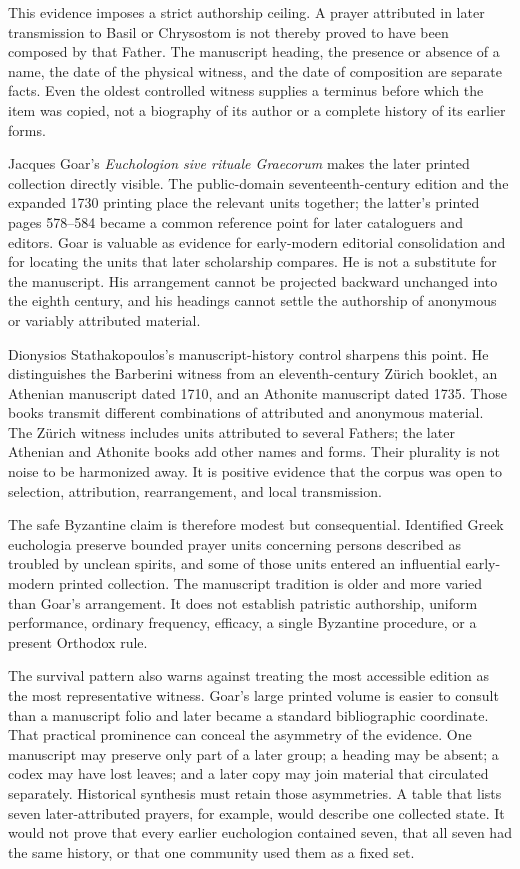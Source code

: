 This evidence imposes a strict authorship ceiling. A prayer attributed in later
transmission to Basil or Chrysostom is not thereby proved to have been composed
by that Father. The manuscript heading, the presence or absence of a name, the
date of the physical witness, and the date of composition are separate facts.
Even the oldest controlled witness supplies a terminus before which the item
was copied, not a biography of its author or a complete history of its earlier
forms.

Jacques Goar's \emph{Euchologion sive rituale Graecorum} makes the later printed
collection directly visible. The public-domain seventeenth-century edition and
the expanded 1730 printing place the relevant units together; the latter's
printed pages 578--584 became a common reference point for later cataloguers
and editors. Goar is valuable as evidence for early-modern editorial
consolidation and for locating the units that later scholarship compares. He
is not a substitute for the manuscript. His arrangement cannot be projected
backward unchanged into the eighth century, and his headings cannot settle the
authorship of anonymous or variably attributed material.

Dionysios Stathakopoulos's manuscript-history control sharpens this point. He
distinguishes the Barberini witness from an eleventh-century Zürich booklet,
an Athenian manuscript dated 1710, and an Athonite manuscript dated 1735.
Those books transmit different combinations of attributed and anonymous
material. The Zürich witness includes units attributed to several Fathers; the
later Athenian and Athonite books add other names and forms. Their plurality is
not noise to be harmonized away. It is positive evidence that the corpus was
open to selection, attribution, rearrangement, and local transmission.

The safe Byzantine claim is therefore modest but consequential. Identified
Greek euchologia preserve bounded prayer units concerning persons described
as troubled by unclean spirits, and some of those units entered an influential
early-modern printed collection. The manuscript tradition is older and more
varied than Goar's arrangement. It does not establish patristic authorship,
uniform performance, ordinary frequency, efficacy, a single Byzantine
procedure, or a present Orthodox rule.

The survival pattern also warns against treating the most accessible edition
as the most representative witness. Goar's large printed volume is easier to
consult than a manuscript folio and later became a standard bibliographic
coordinate. That practical prominence can conceal the asymmetry of the
evidence. One manuscript may preserve only part of a later group; a heading may
be absent; a codex may have lost leaves; and a later copy may join material
that circulated separately. Historical synthesis must retain those
asymmetries. A table that lists seven later-attributed prayers, for example,
would describe one collected state. It would not prove that every earlier
euchologion contained seven, that all seven had the same history, or that one
community used them as a fixed set.

